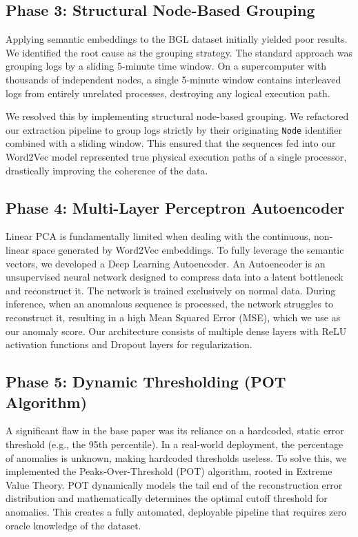 \documentclass[12pt]{article}
\begin{document}
\subsection{Phase 3: Structural Node-Based Grouping}
Applying semantic embeddings to the BGL dataset initially yielded poor results. We identified the root cause as the grouping strategy. The standard approach was grouping logs by a sliding 5-minute time window. On a supercomputer with thousands of independent nodes, a single 5-minute window contains interleaved logs from entirely unrelated processes, destroying any logical execution path.

We resolved this by implementing structural node-based grouping. We refactored our extraction pipeline to group logs strictly by their originating \texttt{Node} identifier combined with a sliding window. This ensured that the sequences fed into our Word2Vec model represented true physical execution paths of a single processor, drastically improving the coherence of the data.

\subsection{Phase 4: Multi-Layer Perceptron Autoencoder}
Linear PCA is fundamentally limited when dealing with the continuous, non-linear space generated by Word2Vec embeddings. To fully leverage the semantic vectors, we developed a Deep Learning Autoencoder. An Autoencoder is an unsupervised neural network designed to compress data into a latent bottleneck and reconstruct it. The network is trained exclusively on normal data. During inference, when an anomalous sequence is processed, the network struggles to reconstruct it, resulting in a high Mean Squared Error (MSE), which we use as our anomaly score. Our architecture consists of multiple dense layers with ReLU activation functions and Dropout layers for regularization.

\subsection{Phase 5: Dynamic Thresholding (POT Algorithm)}
A significant flaw in the base paper was its reliance on a hardcoded, static error threshold (e.g., the 95th percentile). In a real-world deployment, the percentage of anomalies is unknown, making hardcoded thresholds useless. To solve this, we implemented the Peaks-Over-Threshold (POT) algorithm, rooted in Extreme Value Theory. POT dynamically models the tail end of the reconstruction error distribution and mathematically determines the optimal cutoff threshold for anomalies. This creates a fully automated, deployable pipeline that requires zero oracle knowledge of the dataset.
\end{document}
